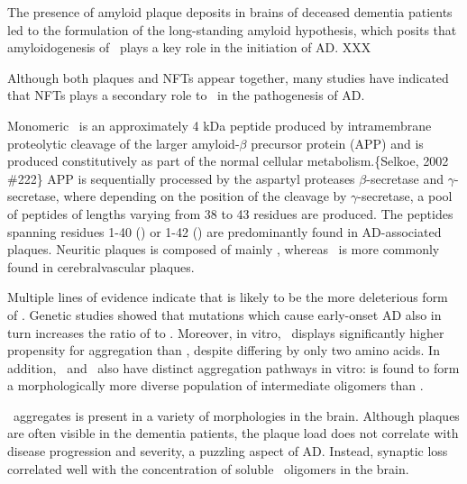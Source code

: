 The presence of amyloid plaque deposits in brains of deceased dementia patients led to the formulation of the long-standing amyloid hypothesis, which posits that amyloidogenesis of \abeta\ plays a key role in the initiation of AD. XXX

Although both plaques and NFTs appear together, many studies have indicated that NFTs plays a secondary role to \abeta\ in the pathogenesis of AD.

Monomeric \abeta\ is an approximately 4 kDa peptide produced by intramembrane proteolytic cleavage of the larger amyloid-$\beta$ precursor protein (APP) and is produced constitutively as part of the normal cellular metabolism.\{Selkoe, 2002 \#222\} APP is sequentially processed by the aspartyl proteases $\beta$-secretase and $\gamma$-secretase, where depending on the position of the cleavage by $\gamma$-secretase, a pool of \abeta peptides of lengths varying from 38 to 43 residues are produced. The peptides spanning residues 1-40 (\abetaforty) or 1-42 (\abetafortytwo) are predominantly found in AD-associated plaques. Neuritic plaques is composed of mainly \abetafortytwo, whereas \abetaforty\ is more commonly found in cerebralvascular plaques.

Multiple lines of evidence indicate that \abetafortytwo is likely to be the more deleterious form of \abeta. Genetic studies showed that mutations which cause early-onset AD also in turn increases the ratio of \abetafortytwo to \abetaforty.\cite{Hardy:1997tu} Moreover, in vitro, \abetafortytwo\ displays significantly higher propensity for aggregation than \abetaforty, despite differing by only two amino acids. In addition, \abetaforty\ and \abetafortytwo\ also have distinct aggregation pathways in vitro: \abetafortytwo is found to form a morphologically more diverse population of intermediate oligomers than \abetaforty.\cite{Bitan:2003ut}


\abeta\ aggregates is present in a variety of morphologies in the brain. Although plaques are often visible in the dementia patients, the plaque load does not correlate with disease progression and severity, a puzzling aspect of AD.  Instead, synaptic loss correlated well with the concentration of soluble \abeta\ oligomers in the brain.

